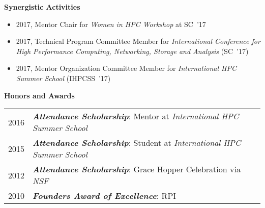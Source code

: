 \documentclass[times,11pt]{article}    %
\begin{document}
\vskip 3pt
\textbf{\sffamily Synergistic Activities}

\begin{itemize}
\item 2017, Mentor Chair for {\em Women in HPC Workshop} at SC~'17
\item 2017, Technical Program Committee Member for {\em International Conference for High Performance Computing, Networking, Storage and Analysis} (SC~'17)
\item 2017, Mentor Organization Committee Member for {\em International HPC Summer School} (IHPCSS~'17)
\end{itemize}

\vskip 6pt
\textbf{\sffamily Honors and Awards}
\vskip 6pt

\begin{tabular}{ll}
2016 & {\em \bf Attendance Scholarship}: Mentor at {\em International HPC Summer School}\\
2015 & {\em \bf Attendance Scholarship}: Student at {\em International HPC Summer School}\\
2012 & {\em \bf Attendance Scholarship}: Grace Hopper Celebration via {\em NSF}\\
2010 & {\em \bf Founders Award of Excellence}: RPI
\end{tabular}



\end{document}
